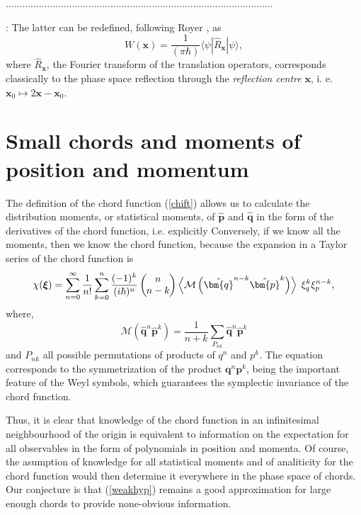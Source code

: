 \documentclass[12pt]{iopart}
\def\p{{\bm{p}}}
\def\q{{\bm{q}}}
\newcommand{\be}{\begin{equation}}
\newcommand{\ee}{\end{equation}}
\newcommand{\x}{{\mathbf x}}
\newcommand{\vct}[1]{\ensuremath\mbox{\boldmath$ #1 $}}
\newcommand{\Vxi}{\vct \xi}
\begin{document}
.................................................................................................

\cite{Wigner}:
The latter can be redefined, following Royer \cite{OzReport,Royer}, as
\be
W(\x)=\frac{1}{(\pi\hbar)}\langle\psi|\hat{R}_{\x}|\psi\rangle,
\label{Wrefl}
\ee
where $\hat{R}_{\x}$, the Fourier transform of the translation operators,
corresponds classically to the phase space reflection through the {\it reflection centre} $\x$,
i. e. $\x_0 \mapsto 2\x - \x_0$.
 







\section{Small chords and moments of position and momentum}




The definition of the chord function (\ref{chift}) allows us to calculate the distribution moments, or statistical moments, of $\hat\p$ and $\hat\q$ in the form of the derivatives of the chord function, i.e. explicitly
Conversely, if we know all the moments, then we know the chord function, 
because the expansion in a Taylor series of the chord function is
\be
\chi(\Vxi)=
\sum_{n=0}^{\infty}\frac1{n!}\sum_{k=0}^{n}\frac{(-1)^{k}}{(i\hbar)^n}\left(\hspace{-.2cm}\begin{array}{c}n\\n-k\end{array}\hspace{-.2cm}\right)%
\left\langle\mathcal{M}\left(\hat\q^{n-k}\hat\p^{k}\right)\right\rangle\hspace{.1cm}\xi_q^k\xi_p^{n-k},
\label{X-exp-momentdis}
\ee
where,
\be
\mathcal{M}\left(\hat\q^{n}\hat\p^{k}\right)=
\frac{1}{n+k}\sum_{P_{nk}}\hat\q^{n}\hat\p^{k}
\label{permutations}
\ee
and $P_{nk}$ all possible permutations of products of $q^n$ and $p^k$. 
The equation  corresponds to the symmetrization of the product $\q^n\p^k$, 
being the important feature of the Weyl symbols, which guarantees the symplectic invariance of the chord function.
\par
Thus, it is clear that knowledge of the chord function in an infinitesimal neighbourhood of the origin
is equivalent to information on the expectation for all observables in the form of polynomials in position and momenta.
Of course, the asumption of knowledge for all statistical moments and of analiticity for the chord function
would then determine it everywhere in the phase space of chords. Our conjecture is that (\ref{weakhyp})
remains a good approximation for large enough chords to provide none-obvious information. 
\end{document}
